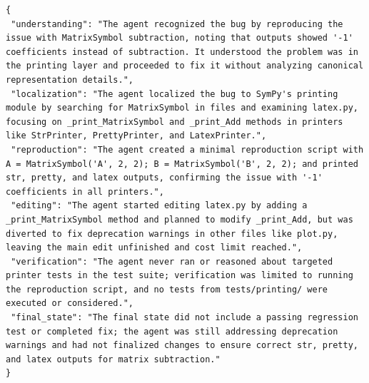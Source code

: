 \documentclass[10pt,twocolumn]{article}
\begin{document}
\begin{lstlisting}
{
 "understanding": "The agent recognized the bug by reproducing the issue with MatrixSymbol subtraction, noting that outputs showed '-1' coefficients instead of subtraction. It understood the problem was in the printing layer and proceeded to fix it without analyzing canonical representation details.",
 "localization": "The agent localized the bug to SymPy's printing module by searching for MatrixSymbol in files and examining latex.py, focusing on _print_MatrixSymbol and _print_Add methods in printers like StrPrinter, PrettyPrinter, and LatexPrinter.",
 "reproduction": "The agent created a minimal reproduction script with A = MatrixSymbol('A', 2, 2); B = MatrixSymbol('B', 2, 2); and printed str, pretty, and latex outputs, confirming the issue with '-1' coefficients in all printers.",
 "editing": "The agent started editing latex.py by adding a _print_MatrixSymbol method and planned to modify _print_Add, but was diverted to fix deprecation warnings in other files like plot.py, leaving the main edit unfinished and cost limit reached.",
 "verification": "The agent never ran or reasoned about targeted printer tests in the test suite; verification was limited to running the reproduction script, and no tests from tests/printing/ were executed or considered.",
 "final_state": "The final state did not include a passing regression test or completed fix; the agent was still addressing deprecation warnings and had not finalized changes to ensure correct str, pretty, and latex outputs for matrix subtraction."
}
\end{lstlisting}
\end{document}
